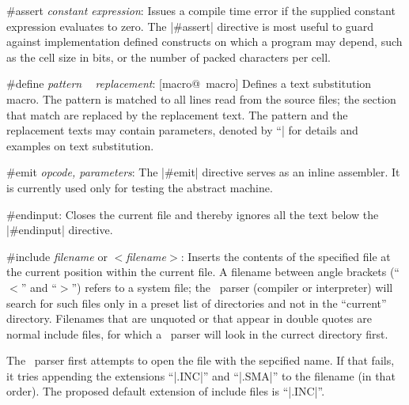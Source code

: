 \beginlist{35pt}
\item \#assert {\it constant expression\/}: 
        Issues a compile time error if the supplied constant expression
        evaluates to zero.
        The |#assert| directive is most useful to guard against implementation
        defined constructs on which a program may depend, such as the cell size
        in bits, or the number of packed characters per cell.

\item \#define {\it pattern ~ replacement\/}:
         [macro@\midtilde\ macro] 
        Defines a text substitution macro. The pattern is matched to all lines
        read from the source files; the section that match are replaced by the
        replacement text. The pattern and the replacement texts may contain
        parameters, denoted by ``|%
        for details and examples on text substitution.

\item \#emit {\it opcode, parameters\/}:
        The |#emit| directive serves as an inline assembler. It is currently
        used only for testing the abstract machine.

\item \#endinput:
        Closes the current file and thereby ignores all the text below the
        |#endinput| directive.

\item \#include {\it filename\/} or $<${\it filename\/}$>$:
        Inserts the contents of the specified file at the current position
        within the current file. A filename between angle brackets (``$<$'' and ``$>$'')
        refers to a system file; the \Small\ parser (compiler or interpreter) will
        search for such files only in a preset list of directories and not in
        the ``current'' directory. Filenames that are unquoted or that appear in
        double quotes are normal include files, for which a \Small\ parser
        will look in the currect directory first.

        The \Small\ parser first attempts to open the file with the sepcified
        name. If that fails, it tries appending the extensions ``|.INC|'' and ``|.SMA|''
        to the filename (in that order).
        The proposed default extension of include files is ``|.INC|''.

